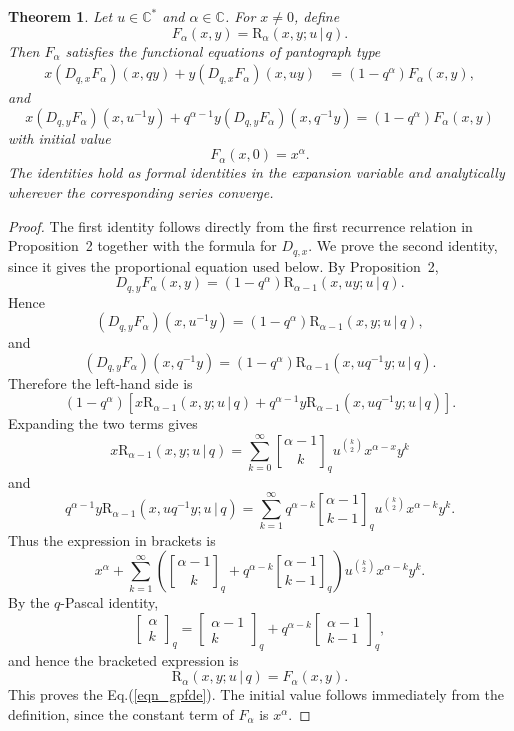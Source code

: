 \documentclass[12pt]{article}
\newcommand{\qbinom}{\genfrac{[}{]}{0pt}{}}
\newcommand{\rr}{\mathrm{R}}
\newtheorem{theorem}{Theorem}
\begin{document}
\begin{theorem}
Let \(u\in\mathbb C^\ast\) and \(\alpha\in\mathbb C\). For \(x\neq0\), define
\[
F_\alpha(x,y)=\rr_{\alpha}(x,y;u\,|\,q).
\]
Then \(F_\alpha\) satisfies the functional equations of pantograph type
\begin{align}
x(D_{q,x}F_\alpha)(x,qy)
+
y(D_{q,x}F_\alpha)(x,uy)
&=
(1-q^\alpha)F_\alpha(x,y),\label{eqn_gpfde2}
\end{align}
and
\begin{equation}\label{eqn_gpfde}
x(D_{q,y}F_\alpha)(x,u^{-1}y)
+
q^{\alpha-1}y(D_{q,y}F_\alpha)(x,q^{-1}y)
=
(1-q^\alpha)F_\alpha(x,y)    
\end{equation}
with initial value
\[
F_\alpha(x,0)=x^\alpha.
\]
The identities hold as formal identities in the expansion variable and analytically wherever the corresponding series converge.
\end{theorem}
\begin{proof}
The first identity follows directly from the first recurrence relation in Proposition~2 together with the formula for \(D_{q,x}\). We prove the second identity, since it gives the proportional equation used below. By Proposition~2,
\[
D_{q,y}F_\alpha(x,y)
=
(1-q^\alpha)\rr_{\alpha-1}(x,uy;u\,|\,q).
\]
Hence
\[
(D_{q,y}F_\alpha)(x,u^{-1}y)
=
(1-q^\alpha)\rr_{\alpha-1}(x,y;u\,|\,q),
\]
and
\[
(D_{q,y}F_\alpha)(x,q^{-1}y)
=
(1-q^\alpha)\rr_{\alpha-1}(x,uq^{-1}y;u\,|\,q).
\]
Therefore the left-hand side is
\[
(1-q^\alpha)
\left[
x\rr_{\alpha-1}(x,y;u\,|\,q)
+
q^{\alpha-1}y\rr_{\alpha-1}(x,uq^{-1}y;u\,|\,q)
\right].
\]
Expanding the two terms gives
\[
x\rr_{\alpha-1}(x,y;u\,|\,q)
=
\sum_{k=0}^{\infty}\qbinom{\alpha-1}{k}_q
u^{\binom{k}{2}}x^{\alpha-x}y^k
\]
and
\[
q^{\alpha-1}y\rr_{\alpha-1}(x,uq^{-1}y;u\,|\,q)
=
\sum_{k=1}^{\infty}
q^{\alpha-k}\qbinom{\alpha-1}{k-1}_q
u^{\binom{k}{2}}x^{\alpha-k}y^k.
\]
Thus the expression in brackets is
\[
x^\alpha+
\sum_{k=1}^{\infty}
\left(\qbinom{\alpha-1}{k}_q+
q^{\alpha-k}\qbinom{\alpha-1}{k-1}_q
\right)
u^{\binom{k}{2}}x^{\alpha-k}y^k.
\]
By the \(q\)-Pascal identity,
\[
\begin{bmatrix}
\alpha\\ k
\end{bmatrix}_q
=
\begin{bmatrix}
\alpha-1\\ k
\end{bmatrix}_q
+
q^{\alpha-k}
\begin{bmatrix}
\alpha-1\\ k-1
\end{bmatrix}_q,
\]
and hence the bracketed expression is
\[
\rr_{\alpha}(x,y;u\,|\,q)=F_\alpha(x,y).
\]
This proves the Eq.(\ref{eqn_gpfde}). The initial value follows immediately from
the definition, since the constant term of \(F_\alpha\) is \(x^\alpha\).
\end{proof}
\end{document}
